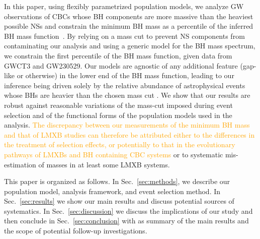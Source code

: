 \documentclass[modern]{aastex631}
\begin{document}
In this paper, using flexibly parametrized population models, we analyze GW
observations of CBCs whose BH components are more massive than the heaviest
possible NSs and constrain the minimum BH mass as a percentile of the inferred
BH mass function~\citep{Farr:2010tu}.  By relying on a mass cut to prevent NS
components from contaminating our analysis and using a generic model for the BH
mass spectrum, we constrain the first percentile of the BH mass function, given
data from GWCT3 and GW230529.  Our models are agnostic of any additional feature (gap-like
or otherwise) in the lower end of the BH mass function, leading to our inference
being driven solely by the relative abundance of astrophysical events whose BHs
are heavier than the chosen mass cut . We show that our results are robust against reasonable variations of
the mass-cut imposed during event selection and of the functional forms of the
population models used in the analysis. \textcolor{orange}{The discrepancy
between our measurements of the minimum BH mass and that of LMXB studies can
therefore be attributed either to the differences in the treatment of selection
effects, or potentially to that in the evolutionary pathways of LMXBs and BH
containing CBC systems} or to systematic mis-estimation of
masses in at least some LMXB systems.


This paper is organized as follows. In Sec.~\ref{sec:methods}, we describe our population model, analysis framework, and event selection method. In Sec.~\ref{sec:results} we show our main results and discuss potential sources of systematics. In Sec.~\ref{sec:discussion} we discuss the implications of our study and then conclude in Sec.~\ref{sec:conclusion} with as summary of the main results and the scope of potential follow-up investigations.
\end{document}

